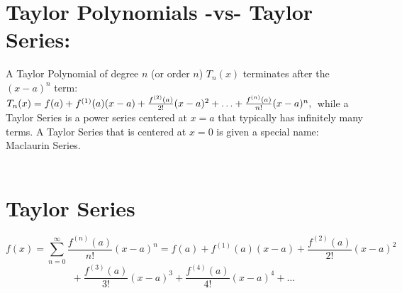
\vspace*{.1in}

\section*{Taylor Polynomials -vs- Taylor Series:}
 A Taylor Polynomial of degree \(n\) (or order \(n\)) \(T_n(x)\) terminates after the \((x-a)^n\) term:
\(
T_n(x) = f(a) + f^{(1)}(a)(x-a) + \frac{f^{(2)}(a)}{2!}(x-a)^2+\ldots+\frac{f^{(n)}(a)}{n!}(x-a)^n,\\
\)
while a Taylor Series is a power series centered at \(x=a\) that typically has infinitely many terms. A Taylor Series that is centered at \(x=0\) is given a special name: Maclaurin Series.\\~\\

\vspace*{.1in}

\section*{Taylor Series}%
\[
f(x) = \sum_{n=0}^\infty \frac{f^{(n)}(a)}{n!}(x-a)^n = f(a) + f^{(1)}(a)(x-a) + \frac{f^{(2)}(a)}{2!}(x-a)^2
\]
\[
 +\ \frac{f^{(3)}(a)}{3!}(x-a)^3+\frac{f^{(4)}(a)}{4!}(x-a)^4+\ldots
\]

